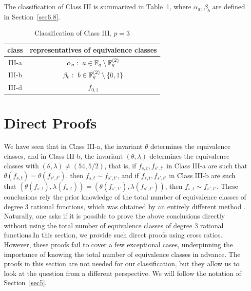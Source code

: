 \documentclass{amsart}
\numberwithin{equation}{section}
\theoremstyle{definition}
\newcommand{\f}{\Bbb F}
\begin{document}
The classification of Class III is summarized in Table~\ref{tb:IIIp=3}, where $\alpha_a, \beta_b$ are defined in Section~\ref{sec6.8}.

\begin{table}[ht]
\caption{Classification of Class III, $p=3$}\label{tb:IIIp=3}
   \renewcommand*{\arraystretch}{1.4}
    \centering
     \begin{tabular}{c|c}
         \hline
         class & representatives of equivalence classes \\ \hline
         III-a & $\alpha_a:\ a\in\f_q\setminus\f_q^{(2)}$ \\
         III-b & $\beta_b:\ b\in\f_q^{(2)}\setminus\{0,1\}$ \\
         III-d & $f_{0,1}$
            \\ \hline
     \end{tabular}
\end{table}



\section{Direct Proofs}

We have seen that in Class III-a, the invariant $\theta$ determines the equivalence classes, and in Class III-b, the invariant $(\theta,\lambda)$ determines the equivalence classes with $(\theta,\lambda)\ne(54,5/2)$, that is, if $f_{s,t}, f_{s',t'}$ in Class III-a are such that $\theta(f_{s,t})=\theta(f_{s',t'})$, then $f_{s,t}\sim f_{s',t'}$, and if $f_{s,t}, f_{s',t'}$ in Class III-b are such that $(\theta(f_{s,t}),\lambda(f_{s,t}))=(\theta(f_{s',t'}),\lambda(f_{s',t'}))$, then $f_{s,t}\sim f_{s',t'}$. These conclusions rely the prior knowledge of the total number of equivalence classes of degree 3 rational functions, which was obtained by an entirely different method \cite{Hou-AA-2025}. Naturally, one asks if it is possible to prove the above conclusions directly without using the total number of equivalence classes of degree 3 rational functions.In this section, we provide such direct proofs using cross ratios. However, these proofs fail to cover a few exceptional cases, underpinning the importance of knowing the total number of equivalence classes in advance. The proofs in this section are not needed for our classification, but they allow us to look at the question from a different perspective. We will follow the notation of Section~\ref{sec5}.
\end{document}
